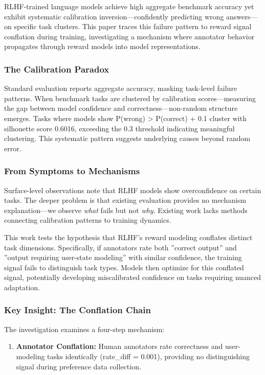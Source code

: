 
RLHF-trained language models achieve high aggregate benchmark accuracy yet exhibit systematic calibration inversion---confidently predicting wrong answers---on specific task clusters. This paper traces this failure pattern to reward signal conflation during training, investigating a mechanism where annotator behavior propagates through reward models into model representations.

\subsubsection{The Calibration Paradox}

Standard evaluation reports aggregate accuracy, masking task-level failure patterns. When benchmark tasks are clustered by calibration scores---measuring the gap between model confidence and correctness---non-random structure emerges. Tasks where models show P(wrong) > P(correct) + 0.1 cluster with silhouette score 0.6016, exceeding the 0.3 threshold indicating meaningful clustering. This systematic pattern suggests underlying causes beyond random error.

\subsubsection{From Symptoms to Mechanisms}

Surface-level observations note that RLHF models show overconfidence on certain tasks. The deeper problem is that existing evaluation provides no mechanism explanation---we observe \textit{what} fails but not \textit{why}. Existing work lacks methods connecting calibration patterns to training dynamics.

This work tests the hypothesis that RLHF's reward modeling conflates distinct task dimensions. Specifically, if annotators rate both ''correct output'' and ''output requiring user-state modeling'' with similar confidence, the training signal fails to distinguish task types. Models then optimize for this conflated signal, potentially developing miscalibrated confidence on tasks requiring nuanced adaptation.

\subsubsection{Key Insight: The Conflation Chain}

The investigation examines a four-step mechanism:

\begin{enumerate}
\item \textbf{Annotator Conflation:} Human annotators rate correctness and user-modeling tasks identically (rate\_diff = 0.001), providing no distinguishing signal during preference data collection.
\end{enumerate}

